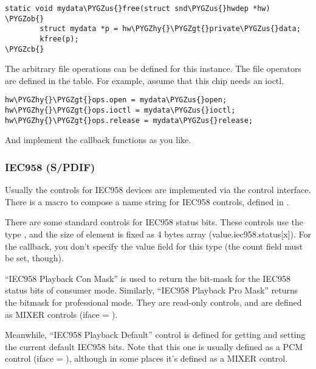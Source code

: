 \documentclass[a4paper,8pt,english]{sphinxmanual}
\def\PYGZus{\char`\_}
\def\PYGZob{\char`\{}
\def\PYGZcb{\char`\}}
\def\PYGZgt{\char`\>}
\def\PYGZhy{\char`\-}
\begin{document}
\begin{Verbatim}[commandchars=\\\{\}]
static void mydata\PYGZus{}free(struct snd\PYGZus{}hwdep *hw)
\PYGZob{}
        struct mydata *p = hw\PYGZhy{}\PYGZgt{}private\PYGZus{}data;
        kfree(p);
\PYGZcb{}
\end{Verbatim}

The arbitrary file operations can be defined for this instance. The file
operators are defined in the  table. For example, assume that
this chip needs an ioctl.

\begin{Verbatim}[commandchars=\\\{\}]
hw\PYGZhy{}\PYGZgt{}ops.open = mydata\PYGZus{}open;
hw\PYGZhy{}\PYGZgt{}ops.ioctl = mydata\PYGZus{}ioctl;
hw\PYGZhy{}\PYGZgt{}ops.release = mydata\PYGZus{}release;
\end{Verbatim}

And implement the callback functions as you like.


\subsubsection{IEC958 (S/PDIF)}
\label{sound/kernel-api/writing-an-alsa-driver:iec958-s-pdif}
Usually the controls for IEC958 devices are implemented via the control
interface. There is a macro to compose a name string for IEC958
controls,  defined in
.

There are some standard controls for IEC958 status bits. These controls
use the type , and the size of element is
fixed as 4 bytes array (value.iec958.status{[}x{]}). For the 
callback, you don't specify the value field for this type (the count
field must be set, though).

“IEC958 Playback Con Mask” is used to return the bit-mask for the IEC958
status bits of consumer mode. Similarly, “IEC958 Playback Pro Mask”
returns the bitmask for professional mode. They are read-only controls,
and are defined as MIXER controls (iface =
).

Meanwhile, “IEC958 Playback Default” control is defined for getting and
setting the current default IEC958 bits. Note that this one is usually
defined as a PCM control (iface = ),
although in some places it's defined as a MIXER control.
\end{document}
